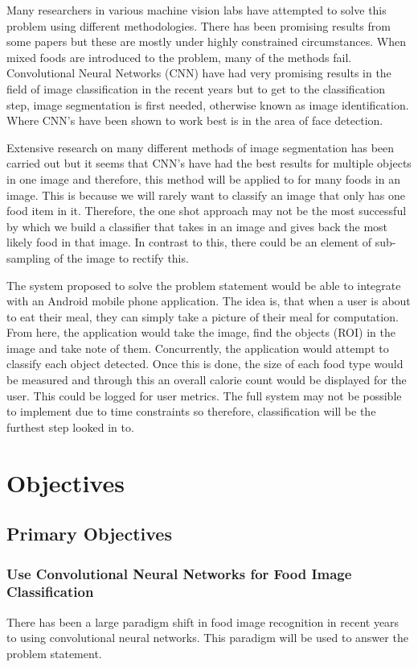 Many researchers in various machine vision labs have attempted to solve this
problem using different methodologies.
There has been promising results from some papers but these are mostly under highly constrained circumstances.
When mixed foods are introduced to the problem, many of the methods fail.
Convolutional Neural Networks (CNN) have had very promising results in the field of image classification in the recent years but to get to the classification step, image segmentation is first needed, otherwise known as image identification.
Where CNN's have been shown to work best is in the area of face detection.

Extensive research on many different methods of image segmentation has been carried out but it seems that CNN's have had the best results for multiple objects in one image and therefore, this method will be applied to for many foods in an image.
This is because we will rarely want to classify an image that only has one food
item in it. Therefore, the one shot approach may not be the most successful by which we
build a classifier that takes in an image and gives back the most likely food in
that image. In contrast to this, there could be an element of sub-sampling of the image to rectify this.

The system proposed to solve the problem statement would be able to integrate with an Android mobile phone application. The idea is, that when a user is about to eat their meal, they can simply take a picture of their meal for computation. From here, the application would take the image, find the objects (ROI) in the image and take note of them.
Concurrently, the application would attempt to classify each object detected.
Once this is done, the size of each food type would be measured and through this an overall calorie count would be displayed for the user. This could be logged for user metrics. The full system may not be possible to implement due to time constraints so therefore, classification will be the furthest step looked in to.

\section{Objectives}
\subsection*{Primary Objectives}
\subsubsection*{Use Convolutional Neural Networks for Food Image Classification}
There has been a large paradigm shift in food image recognition in recent years to using convolutional neural networks. This paradigm will be used to answer the problem statement.

